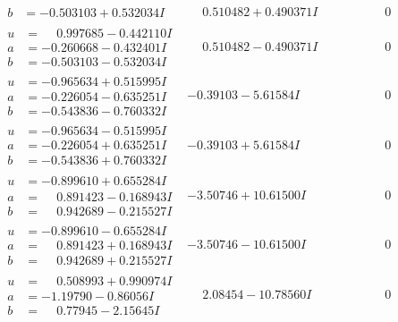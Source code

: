 \documentclass[1p]{elsarticle_modified}
\theoremstyle{definition}
\begin{document}
$$\begin{array}{c|c|c}
\begin{aligned}
b &= -0.503103 + 0.532034 I\end{aligned}
 & \phantom{-}0.510482 + 0.490371 I & \phantom{-0.000000 } 0 \\ \hline\begin{aligned}
u &= \phantom{-}0.997685 - 0.442110 I \\
a &= -0.260668 - 0.432401 I \\
b &= -0.503103 - 0.532034 I\end{aligned}
 & \phantom{-}0.510482 - 0.490371 I & \phantom{-0.000000 } 0 \\ \hline\begin{aligned}
u &= -0.965634 + 0.515995 I \\
a &= -0.226054 - 0.635251 I \\
b &= -0.543836 - 0.760332 I\end{aligned}
 & -0.39103 - 5.61584 I & \phantom{-0.000000 } 0 \\ \hline\begin{aligned}
u &= -0.965634 - 0.515995 I \\
a &= -0.226054 + 0.635251 I \\
b &= -0.543836 + 0.760332 I\end{aligned}
 & -0.39103 + 5.61584 I & \phantom{-0.000000 } 0 \\ \hline\begin{aligned}
u &= -0.899610 + 0.655284 I \\
a &= \phantom{-}0.891423 - 0.168943 I \\
b &= \phantom{-}0.942689 - 0.215527 I\end{aligned}
 & -3.50746 + 10.61500 I & \phantom{-0.000000 } 0 \\ \hline\begin{aligned}
u &= -0.899610 - 0.655284 I \\
a &= \phantom{-}0.891423 + 0.168943 I \\
b &= \phantom{-}0.942689 + 0.215527 I\end{aligned}
 & -3.50746 - 10.61500 I & \phantom{-0.000000 } 0 \\ \hline\begin{aligned}
u &= \phantom{-}0.508993 + 0.990974 I \\
a &= -1.19790 - 0.86056 I \\
b &= \phantom{-}0.77945 - 2.15645 I\end{aligned}
 & \phantom{-}2.08454 - 10.78560 I & \phantom{-0.000000 } 0 \\ \hline\begin{aligned}

\end{aligned}
\end{array}$$
\end{document}
